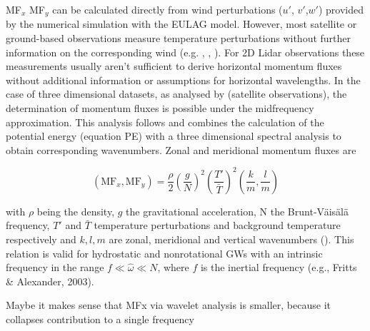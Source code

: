 MF$_x$ MF$_y$ can be calculated directly from wind perturbations ($u'$, $v'$,$w'$) provided by the numerical simulation with the EULAG model. However, most satellite or ground-based observations measure temperature perturbations without further information on the corresponding wind (e.g. \cite{hindley_gravity_2019}, \cite{kaifler_compact_2021}, \cite{wu_satellite_1996}). For 2D Lidar observations these measurements usually aren't sufficient to derive horizontal momentum fluxes without additional information or assumptions for horizontal wavelengths. In the case of three dimensional datasets, as analysed by \textcite{hindley_18year_2020} (satellite observations), the determination of momentum fluxes is possible under the midfrequency approximation. This analysis follows \textcite{ern...} and combines the calculation of the potential energy (equation PE) with a three dimensional spectral analysis to obtain corresponding wavenumbers. Zonal and meridional momentum fluxes are 

\begin{equation}
    (\mathrm{MF}_x, \mathrm{MF}_y) = \frac{\rho}{2} (\frac{g}{N})^2 (\frac{T'}{\bar{T}})^2 (\frac{k}{m},\frac{l}{m})
\end{equation}

with $\rho$ being the density, $g$ the gravitational acceleration, N the Brunt‐Väisälä frequency, $T'$ and $\bar{T}$ temperature perturbations and background temperature respectively and $k,l,m$ are zonal, meridional and vertical wavenumbers (\cite{ern}). This relation is valid for hydrostatic and nonrotational GWs with an intrinsic frequency in the range $f \ll \hat{\omega} \ll N$, where $f$ is the inertial frequency (e.g., Fritts & Alexander, 2003).

Maybe it makes sense that MFx via wavelet analysis is smaller, because it collapses contribution to a single frequency


